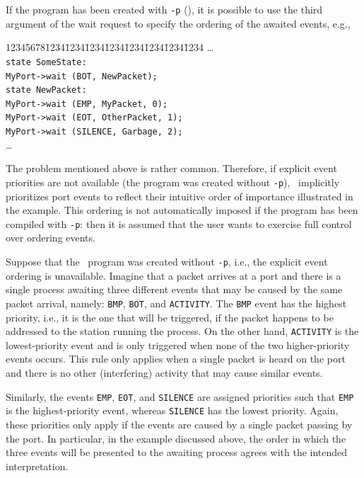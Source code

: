 If the program has been created with 
{\tt -p} (), it
is possible to use the third argument of the wait request
to specify the ordering of the awaited events, e.g.,
{\tt\begin{tabbing}
12345678\=1234\=1234\=1234\=1234\=1234\=1234\=1234\=1234\kill
\> \ldots \\
\> {\tt state SomeState:}\\
\> \> {\tt MyPort->wait (BOT, NewPacket);}\\
\> {\tt state NewPacket:}\\
\> \> {\tt MyPort->wait (EMP, MyPacket, 0);}\\
\> \> {\tt MyPort->wait (EOT, OtherPacket, 1);}\\
\> \> {\tt MyPort->wait (SILENCE, Garbage, 2);}\\
\> \ldots
\end{tabbing}}
The problem mentioned above is rather common.
Therefore, if explicit event priorities are not available (the program
was created without {\tt -p}), \smurph\ implicitly prioritizes
port events
to reflect their intuitive order of importance illustrated in the example.
This ordering is not automatically imposed
if the program has been compiled with
{\tt -p}: then it is assumed that the user wants to exercise full control
over ordering events.

Suppose that the \smurph\ program was created without
{\tt -p}, i.e., the explicit event ordering is unavailable.
Imagine that a packet arrives at a port and there is
a single process awaiting three different events that may be caused by the
same packet arrival, namely: {\tt BMP}, {\tt BOT}, and {\tt ACTIVITY}.
The {\tt BMP} event has the highest priority, i.e.,
it is the one that will be triggered, if the packet happens to be
addressed to the station running the process.
On the other hand, {\tt ACTIVITY} is the lowest-priority event and is only
triggered when none of the two higher-priority events occurs.
This rule only applies when a single packet is heard on the port and there is no
other (interfering) activity that may cause similar events.

Similarly, the events {\tt EMP}, {\tt EOT}, and {\tt SILENCE} are
assigned priorities such that {\tt EMP} is the highest-priority
event, whereas {\tt SILENCE} has the lowest priority.
Again, these priorities only apply if the events are caused by a single
packet passing by the port.
In particular, in the example discussed above, the order in which the
three events will be presented to the awaiting process agrees with the
intended interpretation.

